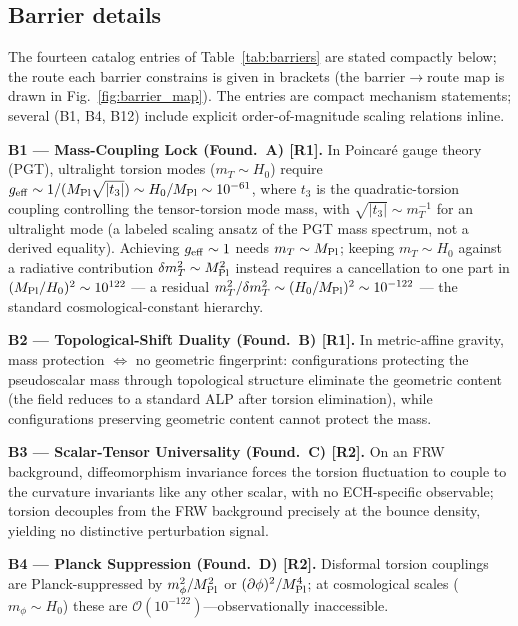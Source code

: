 \documentclass[aps,prd,twocolumn,superscriptaddress,showpacs,preprintnumbers,nofootinbib,longbibliography,floatfix]{revtex4-2}
\newcommand{\MPl}{M_{\rm Pl}}
\begin{document}
\subsection{Barrier details}\label{sec:barrier_details}

The fourteen catalog entries of Table~\ref{tab:barriers} are stated compactly
below; the route each barrier constrains is given in brackets (the
barrier$\to$route map is drawn in Fig.~\ref{fig:barrier_map}). The entries
are compact mechanism statements; several (B1, B4, B12) include explicit
order-of-magnitude scaling relations inline.

\medskip\noindent\textbf{B1 --- Mass-Coupling Lock (Found.\ A) [R1].} In Poincar\'{e} gauge
theory (PGT), ultralight torsion modes ($m_T\sim H_0$) require
$g_{\rm eff} \sim 1/(\MPl\sqrt{|t_3|}) \sim H_0/\MPl \sim 10^{-61}$, where $t_3$
is the quadratic-torsion coupling controlling the tensor-torsion mode mass, with
$\sqrt{|t_3|} \sim m_T^{-1}$ for an ultralight mode (a labeled scaling ansatz of
the PGT mass spectrum, not a derived equality). Achieving $g_{\rm eff}\sim 1$
needs $m_T\sim\MPl$; keeping $m_T\sim H_0$ against a radiative
contribution $\delta m_T^2\sim\MPl^2$ instead requires a cancellation to
one part in $(\MPl/H_0)^2\sim10^{122}$ --- a residual
$m_T^2/\delta m_T^2\sim (H_0/\MPl)^2 \sim 10^{-122}$ --- the standard
cosmological-constant hierarchy.

\medskip\noindent\textbf{B2 --- Topological-Shift Duality (Found.\ B) [R1].} In metric-affine
gravity, mass protection $\iff$ no geometric fingerprint: configurations
protecting the pseudoscalar mass through topological structure eliminate the
geometric content (the field reduces to a standard ALP after torsion
elimination), while configurations preserving geometric content cannot protect
the mass.

\medskip\noindent\textbf{B3 --- Scalar-Tensor Universality (Found.\ C) [R2].} On an FRW
background, diffeomorphism invariance forces the torsion fluctuation to couple to
the curvature invariants like any other scalar, with no ECH-specific observable;
torsion decouples from the FRW background precisely at the bounce density,
yielding no distinctive perturbation signal.

\medskip\noindent\textbf{B4 --- Planck Suppression (Found.\ D) [R2].} Disformal torsion couplings
are Planck-suppressed by $m_\phi^2/\MPl^2$ or $(\partial\phi)^2/\MPl^4$; at
cosmological scales ($m_\phi\sim H_0$) these are
$\mathcal{O}(10^{-122})$---observationally inaccessible.
\end{document}
